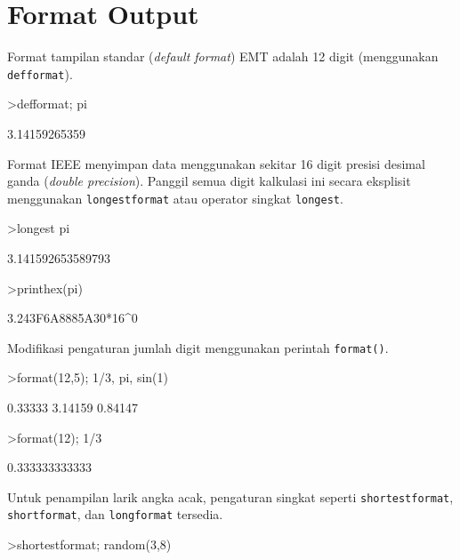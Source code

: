 \documentclass[a4paper,11pt,oneside,enabledeprecatedfontcommands]{scrbook}
\newenvironment{eulernotebook}{}{}
\newcommand{\eulersubheading}[1]{\section{#1}}
\newenvironment{eulercomment}{\par\medskip\noindent}{\par\medskip}
\begin{document}
\begin{eulernotebook}
\eulersubheading{Format Output}
\begin{eulercomment}
Format tampilan standar (\emph{default format}) EMT adalah 12 digit (menggunakan \texttt{defformat}).
\end{eulercomment}
\begin{eulerprompt}
>defformat; pi
\end{eulerprompt}
\begin{euleroutput}
3.14159265359
\end{euleroutput}
\begin{eulercomment}
Format IEEE menyimpan data menggunakan sekitar 16 digit presisi desimal ganda (\emph{double precision}). Panggil semua digit kalkulasi ini secara eksplisit menggunakan \texttt{longestformat} atau operator singkat \texttt{longest}.
\end{eulercomment}
\begin{eulerprompt}
>longest pi
\end{eulerprompt}
\begin{euleroutput}
      3.141592653589793 
\end{euleroutput}
\begin{eulerprompt}
>printhex(pi)
\end{eulerprompt}
\begin{euleroutput}
3.243F6A8885A30*16^0
\end{euleroutput}
\begin{eulercomment}
Modifikasi pengaturan jumlah digit menggunakan perintah \texttt{format()}.
\end{eulercomment}
\begin{eulerprompt}
>format(12,5); 1/3, pi, sin(1)
\end{eulerprompt}
\begin{euleroutput}
    0.33333 
    3.14159 
    0.84147 
\end{euleroutput}
\begin{eulerprompt}
>format(12); 1/3
\end{eulerprompt}
\begin{euleroutput}
     0.333333333333 
\end{euleroutput}
\begin{eulercomment}
Untuk penampilan larik angka acak, pengaturan singkat seperti \texttt{shortestformat}, \texttt{shortformat}, dan \texttt{longformat} tersedia.
\end{eulercomment}
\begin{eulerprompt}
>shortestformat; random(3,8)
\end{eulerprompt}
\begin{euleroutput}

\end{euleroutput}
\end{eulernotebook}
\end{document}
